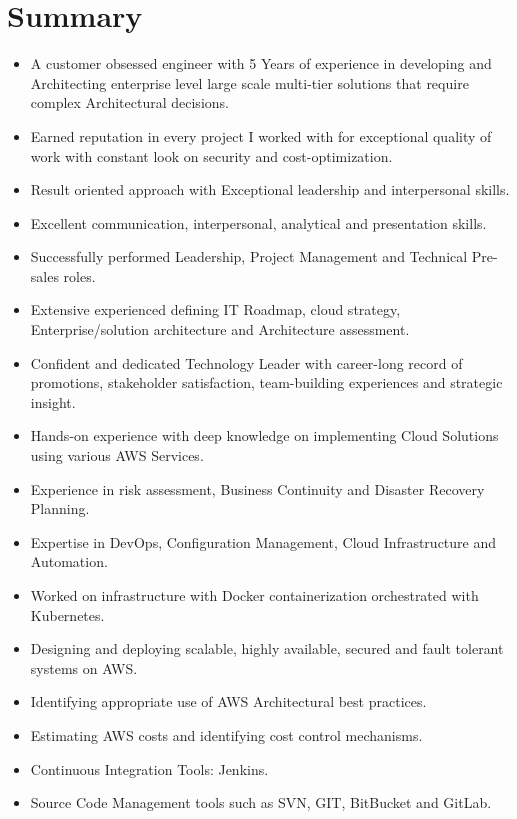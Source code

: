 \documentclass[letterpaper,11pt]{article}
\newcommand{\resumeItemListStart}{\begin{itemize}}
\newcommand{\resumeItemListEnd}{\end{itemize}\vspace{-5pt}}
\begin{document}
\section{Summary}
\resumeItemListStart
\item A customer obsessed engineer with 5 Years of experience in developing and Architecting enterprise level large scale multi-tier solutions that require complex Architectural decisions.
\item Earned reputation in every project I worked with for exceptional quality of work with constant look on security and cost-optimization.
\item Result oriented approach with Exceptional leadership and interpersonal skills.
\item Excellent communication, interpersonal, analytical and presentation skills.
\item Successfully performed Leadership, Project Management and Technical Pre-sales roles.
\item Extensive experienced defining IT Roadmap, cloud strategy, Enterprise/solution architecture and Architecture assessment.
\item Confident and dedicated Technology Leader with career-long record of promotions, stakeholder satisfaction, team-building experiences and strategic insight.
\item Hands-on experience with deep knowledge on implementing Cloud Solutions using various AWS Services.
\item Experience in risk assessment, Business Continuity and Disaster Recovery Planning.
\item Expertise in DevOps, Configuration Management, Cloud Infrastructure and Automation. 
\item Worked on infrastructure with Docker containerization orchestrated with Kubernetes.
\item Designing and deploying scalable, highly available, secured and fault tolerant systems on AWS.
\item Identifying appropriate use of AWS Architectural best practices. 
\item Estimating AWS costs and identifying cost control mechanisms.
\item Continuous Integration Tools: Jenkins.
\item Source Code Management tools such as SVN, GIT, BitBucket and GitLab.
\resumeItemListEnd

\end{document}
